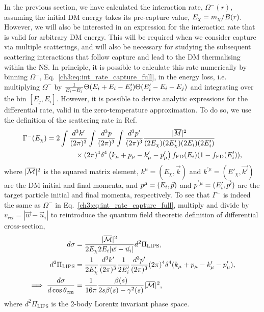 In the previous section, we have calculated the interaction rate, $\Omega^-(r)$, assuming the initial DM energy takes its pre-capture value, $E_\chi = m_\chi /B(r)$. However, we will also be interested in an expression for the interaction rate that is valid for arbitrary DM energy. This will be required when we consider capture via multiple scatterings, and will also be necessary for studying the subsequent scattering interactions that follow capture and lead to the DM thermalising within the NS.
In principle, it is possible to calculate this rate numerically by binning $\Omega^-$, Eq.~\ref{ch3:eq:int_rate_capture_full}, in the energy loss, i.e. multiplying $\Omega^-$ by $\frac{1}{E_i-E_j}\Theta(E_i+E_i-E_i')\Theta(E_i'-E_i-E_j)$ and integrating over the bin $[E_j,E_i]$. 
However, it is possible to derive analytic expressions for the differential rate, valid in the zero-temperature approximation. To do so, we use the definition of the scattering rate in Ref.~\cite{Reddy:1997yr_Neutrinointeractionshot,Bertoni:2013bsa_dec_DarkMatterThermalization} 
\begin{equation}
    \begin{split}
        \Gamma^-(E_\chi) &= 2\int \frac{d^3k'}{(2\pi)^3}\int \frac{d^3p}{(2\pi)^3}\int \frac{d^3p'}{(2\pi)^3} \frac{|\overline{M}|^2}{(2E_\chi)(2E'_\chi)(2E_i)(2E_i')}\\
        &\hspace{4em}\times(2\pi)^4\delta^4\left(k_\mu+p_\mu-k_\mu'-p_\mu'\right) f_{\rm FD}(E_i)(1-f_{\rm FD}(E_i')),
    \end{split}
\label{ch3:eq:scattrate}
\end{equation}
where $|\overline{\mathcal M}|^2$ is the squared matrix element,
$k^\mu=(E_\chi,\vec{k})$ and $k^{'\mu}=(E'_\chi,\vec{k'})$ are the DM initial and final momenta, and $p^\mu=(E_i,\vec{p})$ and $p^{'\mu}=(E_i',\vec{p'})$ are the target particle initial and final momenta, respectively.
To see that $\Gamma^-$ is indeed the same as $\Omega^-$ in Eq.~\ref{ch3:eq:int_rate_capture_full}, multiply and divide by
$v_{rel}=|\vec{w}-\vec{u}_i|$ to reintroduce the quantum field theoretic definition of differential cross-section, 
\begin{align}
    d\sigma & = \frac{|\overline{\mathcal M}|^2}{2 E_\chi 2E_i|\vec{w} - \vec{u}_i|}d^2\Pi_\mathrm{LIPS},\\
    d^2\Pi_\mathrm{LIPS} &= \frac{1}{2E'_\chi}\frac{d^3 k'}{(2\pi)^3}\frac{1}{ 2E_i'}\frac{d^3 p'}{(2\pi)^3}(2\pi)^4\delta^4(k_\mu + p_\mu - k'_\mu - p'_\mu),\\
    \implies\frac{d\sigma}{d\cos\theta_\mathrm{cm}} &= \frac{1}{16 \pi}\frac{\beta(s)}{2 s \beta(s) - \gamma^2(s)}|\overline{\mathcal M}|^2,
\end{align}
where $d^2\Pi_\mathrm{LIPS}$ is the 2-body Lorentz invariant phase space.

